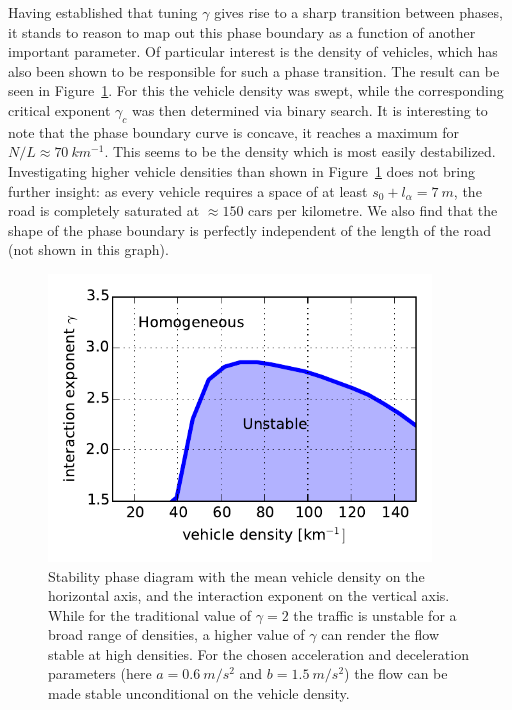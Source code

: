 Having established that tuning $\gamma$ gives rise to a sharp transition between phases, it stands to reason to map out this phase boundary as a function of another important parameter. Of particular interest is the density of vehicles, which has also been shown to be responsible for such a phase transition. The result can be seen in Figure~\ref{fig:phase_diagram}. For this the vehicle density was swept, while the corresponding critical exponent $\gamma_c$ was then determined via binary search. It is interesting to note that the phase boundary curve is concave, it reaches a maximum for $N/L \approx \SI{70}{km^{-1}}$. This seems to be the density which is most easily destabilized. Investigating higher vehicle densities than shown in Figure~\ref{fig:phase_diagram} does not bring further insight: as every vehicle requires a space of at least $s_0+l_\alpha= \SI{7}{m}$, the road is completely saturated at $\approx 150$ cars per kilometre. We also find that the shape of the phase boundary is perfectly independent of the length of the road (not shown in this graph).
\begin{figure}
    \centering
    \includegraphics[width=4in]{../img/phase_diagram.pdf}
    \caption{Stability phase diagram with the mean vehicle density on the horizontal axis, and the interaction exponent on the vertical axis. While for the traditional value of $\gamma=2$ the traffic is unstable for a broad range of densities, a higher value of $\gamma$ can render the flow stable at high densities. For the chosen acceleration and deceleration parameters (here $a=\SI{0.6}{m/s^2}$ and $b=\SI{1.5}{m/s^2}$) the flow can be made stable unconditional on the vehicle density.}
    \label{fig:phase_diagram}
\end{figure}


